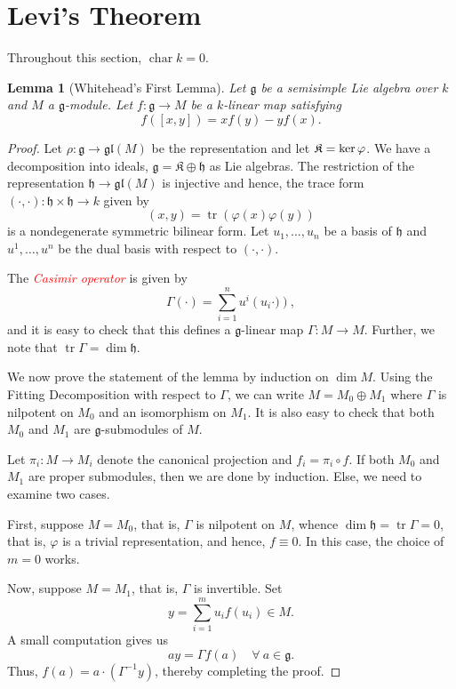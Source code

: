 \documentclass[12pt]{article}
\theoremstyle{thmstyle}
\newtheorem{lemma}[theorem]{Lemma}
\theoremstyle{defstyle}
\newcommand{\chr}{\operatorname{char}}
\newcommand{\tr}{\operatorname{tr}}
\newcommand{\frakg}{\mathfrak{g}}
\newcommand{\frakh}{\mathfrak{h}}
\newcommand{\frakK}{\mathfrak{K}}
\newcommand{\caution}[1]{\textcolor{red}{\textit{#1}}}
\newcommand{\gl}{\mathfrak{gl}}
\begin{document}
\section{Levi's Theorem}

Throughout this section, $\chr k = 0$.

\begin{lemma}[Whitehead's First Lemma]
    Let $\frakg$ be a semisimple Lie algebra over $k$ and $M$ a $\frakg$-module. Let $f: \frakg\to M$ be a $k$-linear map satisfying 
    \begin{equation*}
        f([x, y]) = xf(y) - yf(x).
    \end{equation*}
\end{lemma}
\begin{proof}
    Let $\rho: \frakg\to\gl(M)$ be the representation and let $\frak K = \ker\varphi$. We have a decomposition into ideals, $\frakg = \frakK\oplus\frakh$ as Lie algebras. The restriction of the representation $\frakh\to\gl(M)$ is injective and hence, the trace form $(\cdot,\cdot):\frakh\times\frakh\to k$ given by 
    \begin{equation*}
        (x, y) = \tr\left(\varphi(x)\varphi(y)\right)
    \end{equation*}
    is a nondegenerate symmetric bilinear form. Let $u_1,\dots,u_n$ be a basis of $\frakh$ and $u^1,\dots,u^n$ be the dual basis with respect to $(\cdot,\cdot)$.

    The \caution{Casimir operator} is given by 
    \begin{equation*}
        \Gamma(\cdot) = \sum_{i = 1}^n u^i\left(u_i\cdot)\right),
    \end{equation*}
    and it is easy to check that this defines a $\frakg$-linear map $\Gamma: M\to M$. Further, we note that $\tr\Gamma = \dim\frakh$.

    We now prove the statement of the lemma by induction on $\dim M$. Using the Fitting Decomposition with respect to $\Gamma$, we can write $M = M_0\oplus M_1$ where $\Gamma$ is nilpotent on $M_0$ and an isomorphism on $M_1$. It is also easy to check that both $M_0$ and $M_1$ are $\frakg$-submodules of $M$.

    Let $\pi_i: M\to M_i$ denote the canonical projection and $f_i = \pi_i\circ f$. If both $M_0$ and $M_1$ are proper submodules, then we are done by induction. Else, we need to examine two cases.

    First, suppose $M = M_0$, that is, $\Gamma$ is nilpotent on $M$, whence $\dim\frakh = \tr\Gamma = 0$, that is, $\varphi$ is a trivial representation, and hence, $f\equiv 0$. In this case, the choice of $m = 0$ works.

    Now, suppose $M = M_1$, that is, $\Gamma$ is invertible. Set 
    \begin{equation*}
        y = \sum_{i = 1}^m u_if(u_i)\in M.
    \end{equation*}
    A small computation gives us 
    \begin{equation*}
        ay = \Gamma f(a)\quad\forall~a\in\frakg.
    \end{equation*}
    Thus, $f(a) = a\cdot(\Gamma^{-1}y)$, thereby completing the proof.
\end{proof}
\end{document}
